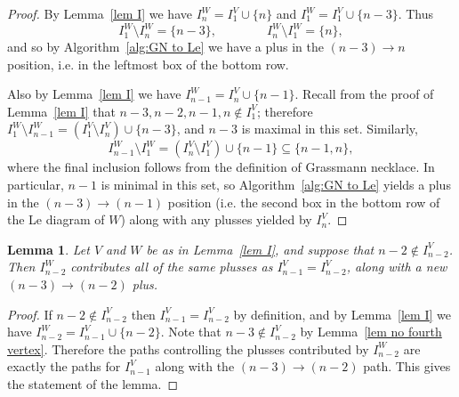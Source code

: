 \documentclass[11pt]{article}
\newtheorem{lem}[thm]{Lemma}
\theoremstyle{remark}
\theoremstyle{definition}
\begin{document}
\begin{proof}
By Lemma~\ref{lem I} we have $I_n^{W}= I_1^{V} \cup \{n\}$ and $I_1^{W} = I_1^{V} \cup \{n-3\}$. Thus 
\[I_1^{W} \setminus I_n^{W} = \{n-3\}, \qquad \qquad I_n^{W} \setminus I_1^{W} = \{n\},\]
and so by Algorithm~\ref{alg:GN to Le} we have a plus in the $(n-3) \rightarrow n$ position, i.e. in the leftmost box of the bottom row.

Also by Lemma~\ref{lem I} we have $I_{n-1}^{W} = I_n^{V} \cup \{n-1\}$. Recall from the proof of Lemma~\ref{lem I} that $n-3,n-2,n-1,n \not\in I_1^V$; therefore $I_1^W\setminus I_{n-1}^W = (I_1^V \setminus I_n^V) \cup\{n-3\}$, and $n-3$ is maximal in this set. Similarly, 
\[I_{n-1}^W \setminus I_1^W = (I_n^V \setminus I_1^V) \cup \{n-1\} \subseteq \{n-1,n\},\]
where the final inclusion follows from the definition of Grassmann necklace. In particular, $n-1$ is minimal in this set, so Algorithm~\ref{alg:GN to Le} yields a plus in the $(n-3) \rightarrow (n-1)$ position (i.e. the second box in the bottom row of the Le diagram of $W$) along with any plusses yielded by $I_n^V$.
\end{proof}



\begin{lem}\label{lem n-2 good}
  Let $V$ and $W$ be as in Lemma~\ref{lem I}, and suppose that $n-2 \not\in I_{n-2}^{V}$. Then $I_{n-2}^{W}$ contributes all of the same plusses as $I_{n-1}^{V}=I_{n-2}^{V}$, along with a new $(n-3)\rightarrow (n-2)$ plus.
\end{lem}

\begin{proof}
If $n-2\not\in I_{n-2}^{V}$ then $I_{n-1}^{V}=I_{n-2}^{V}$ by definition, and by Lemma~\ref{lem I} we have $I_{n-2}^{W} = I_{n-1}^{V} \cup \{n-2\}$.  Note that $n-3\not\in I_{n-2}^{V}$ by Lemma~\ref{lem no fourth vertex}.  Therefore the paths controlling the plusses contributed by $I_{n-2}^{W}$ are exactly the paths for $I_{n-1}^{V}$ along with the $(n-3)\rightarrow (n-2)$ path.  This gives the statement of the lemma.
\end{proof}
\end{document}
